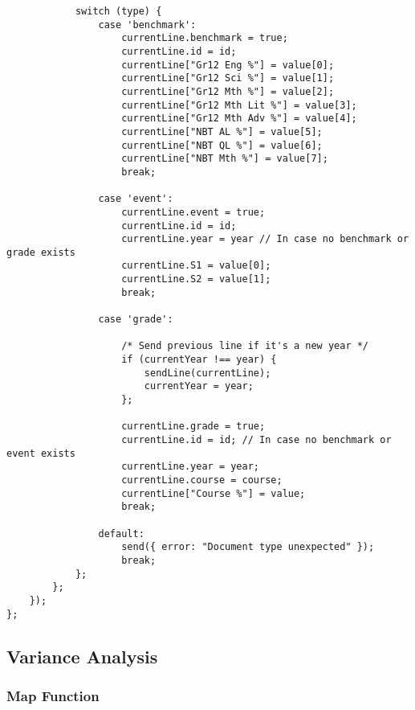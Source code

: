 \begin{verbatim}
            switch (type) {
                case 'benchmark':
                    currentLine.benchmark = true;
                    currentLine.id = id;
                    currentLine["Gr12 Eng %"] = value[0];
                    currentLine["Gr12 Sci %"] = value[1];
                    currentLine["Gr12 Mth %"] = value[2];
                    currentLine["Gr12 Mth Lit %"] = value[3];
                    currentLine["Gr12 Mth Adv %"] = value[4];
                    currentLine["NBT AL %"] = value[5];
                    currentLine["NBT QL %"] = value[6];
                    currentLine["NBT Mth %"] = value[7];
                    break;

                case 'event':
                    currentLine.event = true;
                    currentLine.id = id;
                    currentLine.year = year // In case no benchmark or grade exists
                    currentLine.S1 = value[0];
                    currentLine.S2 = value[1];
                    break;

                case 'grade':

                    /* Send previous line if it's a new year */
                    if (currentYear !== year) {
                        sendLine(currentLine);
                        currentYear = year;
                    };

                    currentLine.grade = true;
                    currentLine.id = id; // In case no benchmark or event exists
                    currentLine.year = year;
                    currentLine.course = course;
                    currentLine["Course %"] = value;
                    break;

                default:
                    send({ error: "Document type unexpected" });
                    break;
            };
        };
    });
};
\end{verbatim}

\subsection{Variance Analysis}
\subsubsection{Map Function}
\label{variance-map-function}
\begin{verbatim}

\end{verbatim}